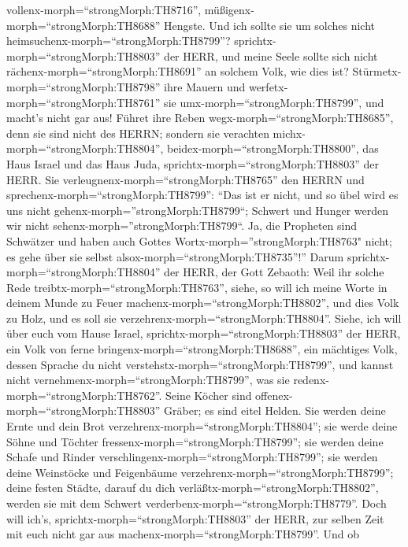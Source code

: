 vollenx-morph=``strongMorph:TH8716'',
müßigenx-morph=``strongMorph:TH8688'' Hengste.  Und ich
sollte sie um solches nicht heimsuchenx-morph=``strongMorph:TH8799''?
sprichtx-morph=``strongMorph:TH8803'' der HERR, und meine Seele sollte
sich nicht rächenx-morph=``strongMorph:TH8691'' an solchem Volk, wie
dies ist?  Stürmetx-morph=``strongMorph:TH8798'' ihre
Mauern und werfetx-morph=``strongMorph:TH8761'' sie
umx-morph=``strongMorph:TH8799'', und macht's nicht gar aus! Führet ihre
Reben wegx-morph=``strongMorph:TH8685'', denn sie sind nicht des HERRN;
 sondern sie verachten michx-morph=``strongMorph:TH8804'',
beidex-morph=``strongMorph:TH8800'', das Haus Israel und das Haus Juda,
sprichtx-morph=``strongMorph:TH8803'' der HERR.  Sie
verleugnenx-morph=``strongMorph:TH8765'' den HERRN und
sprechenx-morph=``strongMorph:TH8799'': ``Das ist er nicht, und so übel
wird es uns nicht gehenx-morph=''strongMorph:TH8799``; Schwert und
Hunger werden wir nicht sehenx-morph=''strongMorph:TH8799``.
 Ja, die Propheten sind Schwätzer und haben auch Gottes
Wortx-morph=''strongMorph:TH8763" nicht; es gehe über sie selbst
alsox-morph=``strongMorph:TH8735''!''  Darum
sprichtx-morph=``strongMorph:TH8804'' der HERR, der Gott Zebaoth: Weil
ihr solche Rede treibtx-morph=``strongMorph:TH8763'', siehe, so will ich
meine Worte in deinem Munde zu Feuer
machenx-morph=``strongMorph:TH8802'', und dies Volk zu Holz, und es soll
sie verzehrenx-morph=``strongMorph:TH8804''.  Siehe, ich
will über euch vom Hause Israel, sprichtx-morph=``strongMorph:TH8803''
der HERR, ein Volk von ferne bringenx-morph=``strongMorph:TH8688'', ein
mächtiges Volk, dessen Sprache du nicht
verstehstx-morph=``strongMorph:TH8799'', und kannst nicht
vernehmenx-morph=``strongMorph:TH8799'', was sie
redenx-morph=``strongMorph:TH8762''.  Seine Köcher sind
offenex-morph=``strongMorph:TH8803'' Gräber; es sind eitel Helden.
 Sie werden deine Ernte und dein Brot
verzehrenx-morph=``strongMorph:TH8804''; sie werde deine Söhne und
Töchter fressenx-morph=``strongMorph:TH8799''; sie werden deine Schafe
und Rinder verschlingenx-morph=``strongMorph:TH8799''; sie werden deine
Weinstöcke und Feigenbäume verzehrenx-morph=``strongMorph:TH8799'';
deine festen Städte, darauf du dich
verläßtx-morph=``strongMorph:TH8802'', werden sie mit dem Schwert
verderbenx-morph=``strongMorph:TH8779''.  Doch will ich's,
sprichtx-morph=``strongMorph:TH8803'' der HERR, zur selben Zeit mit euch
nicht gar aus machenx-morph=``strongMorph:TH8799''.  Und ob

